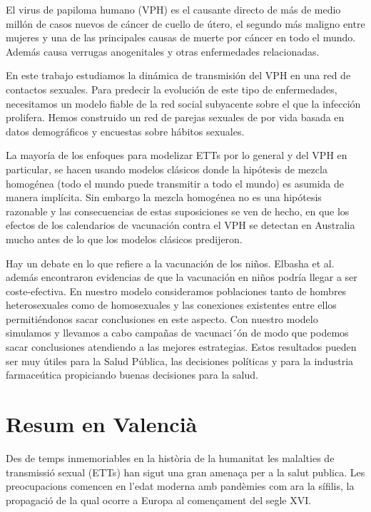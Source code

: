 El virus de papiloma humano (VPH) es el causante directo de m\'as de medio mill\'on de casos nuevos de c\'ancer de cuello de \'utero, el segundo m\'as maligno entre mujeres y una de las principales causas de muerte por c\'ancer en todo el mundo. Adem\'as causa verrugas anogenitales y otras enfermedades relacionadas.

En este trabajo estudiamos la din\'amica de transmisi\'on del VPH en una red de contactos sexuales. Para predecir la evoluci\'on de este tipo de enfermedades, necesitamos un modelo fiable de la red social subyacente sobre el que la infecci\'on prolifera. Hemos construido un red de parejas sexuales de por vida basada en datos demogr\'aficos y encuestas sobre h\'abitos sexuales.

La mayor\'ia de los enfoques para modelizar ETTs por lo general y del VPH en particular, se hacen usando modelos cl\'asicos donde la hip\'otesis de mezcla homog\'enea (todo el mundo puede transmitir a todo el mundo) es asumida de manera impl\'icita. Sin embargo la mezcla homog\'enea no es una hip\'otesis razonable y las consecuencias de estas suposiciones se ven de hecho, en que los efectos de los calendarios de vacunaci\'on contra el VPH se detectan en Australia mucho antes de lo que los modelos cl\'asicos predijeron.

Hay un debate en lo que refiere a la vacunaci\'on de los ni\~nos. Elbasha et al. adem\'as encontraron evidencias de que la vacunaci\'on en ni\~nos podr\'ia llegar a ser coste-efectiva. En nuestro modelo consideramos poblaciones tanto de hombres heterosexuales como de homosexuales y las conexiones existentes entre ellos permiti\'endonos sacar conclusiones en este aspecto. Con nuestro modelo simulamos y llevamos a cabo campa\~nas de vacunaci´\'on de modo que podemos sacar conclusiones atendiendo a las mejores estrategias. Estos resultados pueden ser muy \'utiles para la Salud P\'ublica, las decisiones pol\'iticas y para la industria farmace\'utica propiciando buenas decisiones para la salud.

\chapter*{Resum en Valenci\`a}
Des de temps inmemoriables en la hist\`oria de la humanitat les malalties de transmissi\'o sexual (ETTs) han sigut una gran amenaça per a la salut publica. Les preocupacions comencen en l'edat moderna amb pandèmies com ara la sífilis, la propagaci\'o de la qual ocorre a Europa al començament del segle XVI. 

